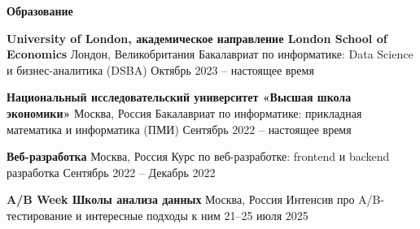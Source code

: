 \begin{center}
    \textbf{Образование}
\end{center}

\textbf{University of London, академическое направление London School of Economics} \hfill Лондон, Великобритания
Бакалавриат по информатике: Data Science и бизнес-аналитика (DSBA) \hfill Октябрь 2023 – настоящее время

\textbf{Национальный исследовательский университет «Высшая школа экономики»} \hfill Москва, Россия
Бакалавриат по информатике: прикладная математика и информатика (ПМИ) \hfill Сентябрь 2022 – настоящее время

\textbf{Веб-разработка} \hfill Москва, Россия
Курс по веб-разработке: frontend и backend разработка \hfill Сентябрь 2022 – Декабрь 2022

\textbf{A/B Week Школы анализа данных} \hfill Москва, Россия
Интенсив про A/B-тестирование и интересные подходы к ним \hfill 21–25 июля 2025

